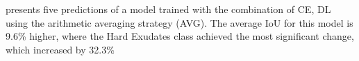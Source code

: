  presents five predictions of a model trained with the combination of \ac{CE}, \ac{DL} using the arithmetic averaging strategy (AVG). The average \ac{IoU} for this model is 9.6\% higher, where the Hard Exudates class achieved the most significant change, which increased by 32.3\% %
\begin{figure}[H]%
  \centering  

\end{figure}
